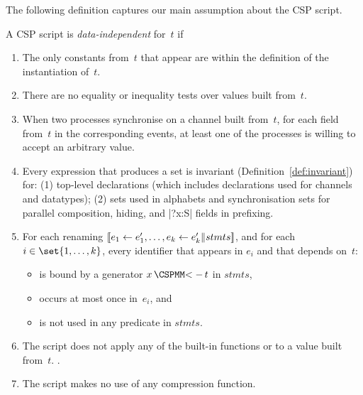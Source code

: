 The following definition captures our main assumption about the CSP script.
%
\begin{definition}
\label{defn:data-independent}
A CSP script is \emph{data-independent} for~$t$ if
\begin{enumerate}
\item The only constants from~$t$ that appear are within the definition
  of the instantiation of~$t$.

\item There are no equality or inequality tests over values built from~$t$.

\item When two processes synchronise on a channel built from~$t$, for each
  field from~$t$ in the corresponding events, at least one of the processes is
  willing to accept an arbitrary value.

\item\label{item:di-invariant} Every expression that produces a set is
  invariant (Definition~\ref{def:invariant}) for: (1) top-level declarations
  (which includes declarations used for channels and datatypes); (2) sets used
  in alphabets and synchronisation sets for parallel composition, hiding, and
  |?x:S| fields in prefixing.

\item\label{item:di-renaming} For each renaming ${[\![}e_1 \leftarrow e_1',
  \ldots, e_k \leftarrow e_k' \| stmts{]\!]}$, and for each~$i \in
  \set{1,\ldots,k}$, every identifier that appears in $e_i$ and that depends
  on~$t$:
%
\begin{itemize}
\item is bound by a generator $x \,\M{<-}\, t$ in $stmts$,
\item occurs at most once in~$e_i$, and
\item is not used in any predicate in $stmts$.
\end{itemize}


\item The script does not apply any of the built-in functions
   or  to a value built from~$t$.
  \framebox{\ldots}. 

\item The script makes no use of any compression function.
\end{enumerate}
\end{definition}

